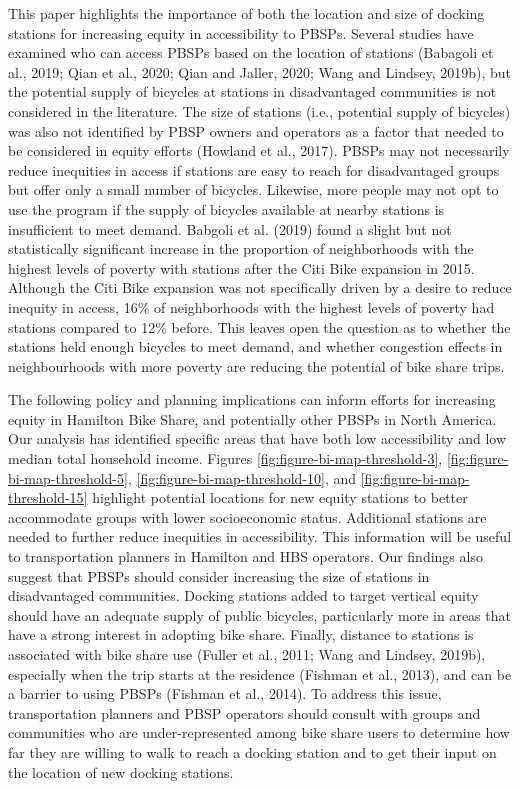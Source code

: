 \documentclass[]{elsarticle} %
\begin{document}
This paper highlights the importance of both the location and size of
docking stations for increasing equity in accessibility to PBSPs.
Several studies have examined who can access PBSPs based on the location
of stations (Babagoli et al., 2019; Qian et al., 2020; Qian and Jaller,
2020; Wang and Lindsey, 2019b), but the potential supply of bicycles at
stations in disadvantaged communities is not considered in the
literature. The size of stations (i.e., potential supply of bicycles)
was also not identified by PBSP owners and operators as a factor that
needed to be considered in equity efforts (Howland et al., 2017). PBSPs
may not necessarily reduce inequities in access if stations are easy to
reach for disadvantaged groups but offer only a small number of
bicycles. Likewise, more people may not opt to use the program if the
supply of bicycles available at nearby stations is insufficient to meet
demand. Babgoli et al. (2019) found a slight but not statistically
significant increase in the proportion of neighborhoods with the highest
levels of poverty with stations after the Citi Bike expansion in 2015.
Although the Citi Bike expansion was not specifically driven by a desire
to reduce inequity in access, 16\% of neighborhoods with the highest
levels of poverty had stations compared to 12\% before. This leaves open
the question as to whether the stations held enough bicycles to meet
demand, and whether congestion effects in neighbourhoods with more
poverty are reducing the potential of bike share trips.

The following policy and planning implications can inform efforts for
increasing equity in Hamilton Bike Share, and potentially other PBSPs in
North America. Our analysis has identified specific areas that have both
low accessibility and low median total household income. Figures
\ref{fig:figure-bi-map-threshold-3},
\ref{fig:figure-bi-map-threshold-5},
\ref{fig:figure-bi-map-threshold-10}, and
\ref{fig:figure-bi-map-threshold-15} highlight potential locations for
new equity stations to better accommodate groups with lower
socioeconomic status. Additional stations are needed to further reduce
inequities in accessibility. This information will be useful to
transportation planners in Hamilton and HBS operators. Our findings also
suggest that PBSPs should consider increasing the size of stations in
disadvantaged communities. Docking stations added to target vertical
equity should have an adequate supply of public bicycles, particularly
more in areas that have a strong interest in adopting bike share.
Finally, distance to stations is associated with bike share use (Fuller
et al., 2011; Wang and Lindsey, 2019b), especially when the trip starts
at the residence (Fishman et al., 2013), and can be a barrier to using
PBSPs (Fishman et al., 2014). To address this issue, transportation
planners and PBSP operators should consult with groups and communities
who are under-represented among bike share users to determine how far
they are willing to walk to reach a docking station and to get their
input on the location of new docking stations.
\end{document}
